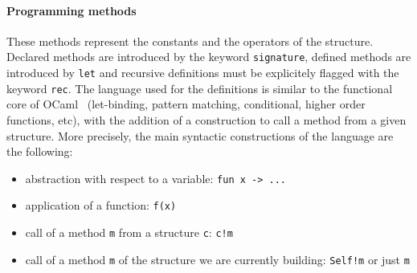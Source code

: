 \documentclass[submission,copyright,creativecommons]{eptcs}
\begin{document}
\paragraph{Programming methods}
These methods represent the constants and the operators of the structure.
Declared methods are introduced by the keyword
{\small \tt signature}, defined methods are introduced by {\small \tt let} and recursive
definitions must be explicitely flagged with the keyword {\small \tt rec}. The
language used for the definitions is similar to the functional core of 
OCaml~\cite{ocamldocu} (let-binding, pattern matching, conditional,
higher order functions, etc),
with the addition of a construction to call a method from a given
structure. More precisely, the main syntactic constructions of the
language are the following:
\begin{itemize}
\item abstraction with respect to a variable: {\small \tt fun x -> ...}
\item application of a function: {\small  \tt f(x)}
\item call of a method {\small \tt m} from a structure {\small \tt c}: 
{\small \tt c!m}
\item call of a method {\small \tt m} of the structure we are currently building:
{\small \tt Self!m} or just {\small \tt m}
\end{itemize}
\end{document}
